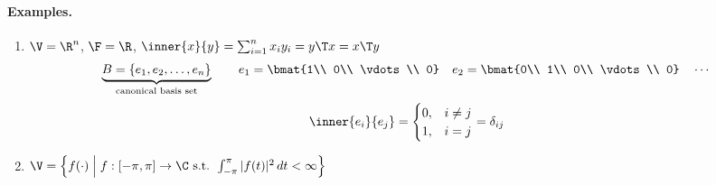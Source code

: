 \paragraph{Examples.}
\begin{enumerate}[label=\arabic*)]
\item $\V=\R^n$, $\F=\R$, \quad $\inner{x}{y} = \sum_{i=1}^n x_iy_i = y\T x = x\T y$
\[
\underbrace{B = \{e_1, e_2, \ldots, e_n\}}_{\text{canonical basis set}} \qquad
e_1 = \bmat{1\\ 0\\ \vdots\\ 0} \quad e_2 = \bmat{0\\ 1\\ 0\\ \vdots\\ 0} \quad \cdots
\]
\[
\inner{e_i}{e_j} = \begin{cases} 0, & i\neq j\\ 1, & i = j\end{cases} = \delta_{ij}
\]
\item $\V = \left\{ f(\cdot) \;\middle|\; f:[-\pi,\pi]\to\C \text{ s.t. } \int_{-\pi}^{\pi}|f(t)|^2\,dt < \infty\right\}$


\end{enumerate}
